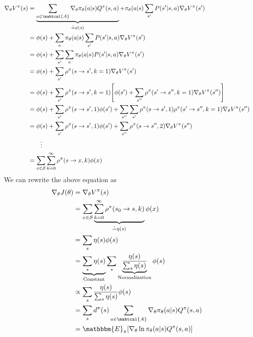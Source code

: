 \begin{align*}
	\nabla_\theta V^\pi(s) &= \underbrace{\sum_{a\in \mahtcal{A}}\nabla_\theta \pi_\theta(a|s)Q^\pi(s,a)}_{\doteq \phi(s)} + \pi_\theta(a|s) \sum_{s'} P(s'|s,a) \nabla_\theta V^\pi(s') \\
	&= \phi(s) + \sum_a \pi_\theta(a|s)\sum_{s'} P(s'|s,a) \nabla_\theta V^\pi(s') \\
	&= \phi(s) + \sum_{s'} \sum_a \pi_\theta(a|s)P(s'|s,a) \nabla_\theta V^\pi(s') \\
	&= \phi(s) + \sum_{s'}\rho^\pi(s\to s', k=1) \nabla_\theta V^\pi(s') \\
	&= \phi(s) + \sum_{s'}\rho^\pi(s\to s', k=1) \Bigg[\phi(s') + \sum_{s''}\rho^\pi(s'\to s'', k=1) \nabla_\theta V^\pi(s'') \Bigg]\\
	&= \phi(s) + \sum_{s'}\rho^\pi(s\to s', 1)\phi(s') + \sum_{s''}\sum_{s'}\rho^\pi(s\to s', 1)\rho^\pi(s'\to s'', k=1) \nabla_\theta V^\pi(s'') \\
	&= \phi(s) + \sum_{s'}\rho^\pi(s\to s', 1)\phi(s') + \sum_{s''}\rho^\pi(s\to s'', 2)\nabla_\theta V^\pi(s'') \\
	& \quad \quad \vdots\\
	&= \sum_{x\in \mathcal{S}}\sum_{k=0}^{\infty}\rho^\pi(s\to x, k)\phi(x)
\end{align*}
We can rewrite the above equation as
\begin{align*}
	\nabla_\theta J(\theta) &= \nabla_\theta V^\pi(s)\\
	&= \sum_{x\in \mathcal{S}}\underbrace{\sum_{k=0}^{\infty}\rho^\pi(s_0\to s, k)}_{\doteq \eta(s)}\phi(x)\\
	&= \sum_s \eta(s)\phi(s)\\
	&= \underbrace{\sum_s \eta(s)}_{\textrm{Constant}}\sum_s \underbrace{\frac{\eta(s)}{\sum_s \eta(s)}}_{\textrm{Normalization}}\phi(s)\\
	&\propto \sum_s \frac{\eta(s)}{\sum_s \eta(s)}\phi(s)\\
	&= \sum_s d^\pi(s)\sum_{a\in \mahtcal{A}}\nabla_\theta \pi_\theta(a|s)Q^\pi(s,a)\\
	&= \mathbbm{E}_{\pi}[\nabla_\theta \ln\pi_\theta(a|s)Q^\pi(s,a)]
\end{align*}
